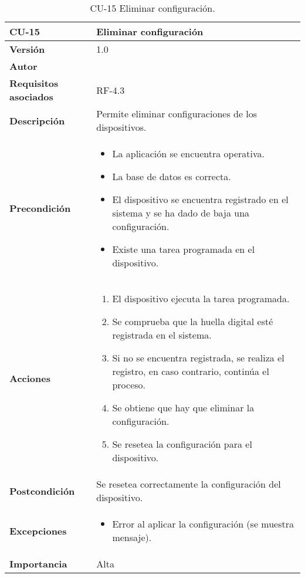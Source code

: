\begin{table}[p]
	\centering
	\begin{tabularx}{\linewidth}{ p{} p{} }
		\toprule
		\textbf{CU-15}    & \textbf{ Eliminar configuración}\\
		\toprule
		\textbf{Versión}              & 1.0    \\
		\textbf{Autor}                & \@author{} \\
		\textbf{Requisitos asociados} & RF-4.3\\
		\textbf{Descripción}          & Permite eliminar configuraciones de los dispositivos. \\
		\textbf{Precondición}         &
		\begin{itemize}
			\tightlist
			\item La aplicación se encuentra operativa.
			\item La base de datos es correcta.
			\item El dispositivo se encuentra registrado en el sistema y se ha dado de baja una configuración.
			\item Existe una tarea programada en el dispositivo.
		\end{itemize}\\
		\textbf{Acciones}             &
		\begin{enumerate}
			\tightlist
			\item El dispositivo ejecuta la tarea programada.
			\item Se comprueba que la huella digital esté registrada en el sistema.
			\item Si no se encuentra registrada, se realiza el registro, en caso contrario, continúa el proceso.
			\item Se obtiene que hay que eliminar la configuración.
			\item Se resetea la configuración para el dispositivo.
		\end{enumerate}\\
		\textbf{Postcondición}        & Se resetea correctamente la configuración del dispositivo.\\
		\textbf{Excepciones}          &
		\begin{itemize}
			\tightlist
			\item Error al aplicar la configuración (se muestra mensaje).
		\end{itemize}\\
		\textbf{Importancia}          & Alta\\
		\bottomrule
	\end{tabularx}
	\caption{CU-15 Eliminar configuración.}\label{tab:table-15}
\end{table}

